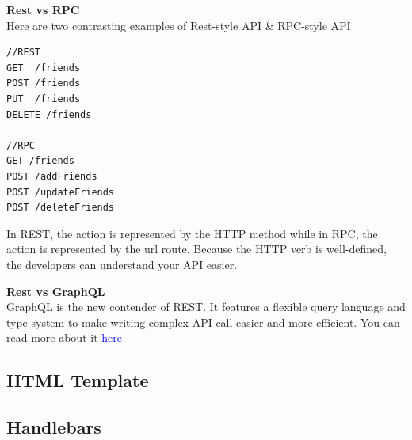 \documentclass[a4paper]{article}
\begin{document}
\textbf{Rest vs RPC}\\
Here are two contrasting examples of Rest-style API \& RPC-style API
\begin{lstlisting}
//REST
GET  /friends
POST /friends
PUT  /friends
DELETE /friends

//RPC
GET /friends
POST /addFriends
POST /updateFriends
POST /deleteFriends
\end{lstlisting}

In REST, the action is represented by the HTTP method while in RPC, the action is represented by the url route. Because the HTTP verb is well-defined, the developers can understand your API easier.

\textbf{Rest vs GraphQL}\\
GraphQL is the new contender of REST. It features a flexible query language and type system to make writing complex API call easier and more efficient. You can read more about it \href{http://graphql.org}{\textcolor{blue}{here}}

\subsection{HTML Template}
\subsection{Handlebars}
\end{document}

